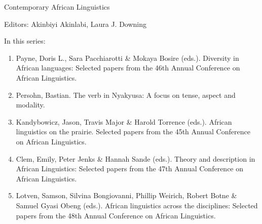 {\large Contemporary African Linguistics}

\bigskip

Editors: Akinbiyi Akinlabi,  Laura J. Downing  


\bigskip

In this series:

\begin{enumerate}
\item Payne, Doris L., Sara Pacchiarotti \& Mokaya Bosire (eds.). Diversity in African languages: Selected papers from the 46th Annual Conference on African Linguistics.
\item Persohn, Bastian. The verb in Nyakyusa: A focus on tense, aspect and modality.
\item Kandybowicz, Jason, Travis Major \& Harold Torrence (eds.). African linguistics on the prairie. Selected papers from the 45th Annual Conference on African Linguistics.
\item Clem, Emily, Peter Jenks \& Hannah Sande (eds.). Theory and description in African Linguistics: Selected papers from the 47th Annual Conference on African Linguistics.
\item Lotven, Samson,    Silvina Bongiovanni,  Phillip Weirich,   Robert Botne \&  Samuel Gyasi Obeng (eds.). African linguistics across the disciplines: Selected papers from the 48th Annual Conference on African Linguistics.
\end{enumerate}


\vfill


